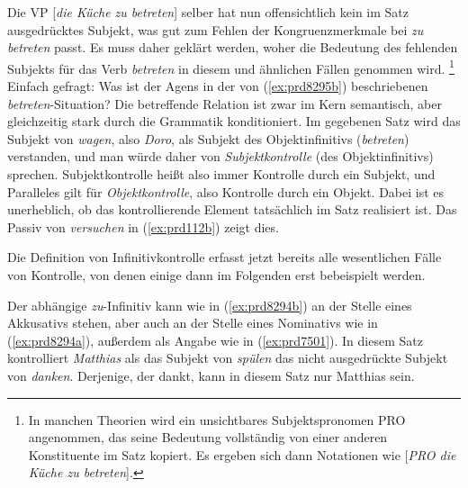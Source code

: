 Die VP [\textit{die Küche zu betreten}] selber hat nun offensichtlich kein im Satz ausgedrücktes Subjekt, was gut zum Fehlen der Kongruenzmerkmale bei \textit{zu betreten} passt.
Es muss daher geklärt werden, woher die Bedeutung des fehlenden Subjekts für das Verb \textit{betreten} in diesem und ähnlichen Fällen genommen wird.%
\footnote{In manchen Theorien wird ein unsichtbares Subjektspronomen PRO angenommen, das seine Bedeutung vollständig von einer anderen Konstituente im Satz kopiert.
Es ergeben sich dann Notationen wie [\textit{PRO die Küche zu betreten}].}
Einfach gefragt:
Was ist der Agens in der von (\ref{ex:prd8295b}) beschriebenen \textit{betreten}-Situation?
Die betreffende Relation ist zwar im Kern semantisch, aber gleichzeitig stark durch die Grammatik konditioniert.
Im gegebenen Satz wird das Subjekt von \textit{wagen}, also \textit{Doro}, als Subjekt des Objektinfinitivs (\textit{betreten}) verstanden, und man würde daher von \textit{Subjektkontrolle} (des Objektinfinitivs) sprechen.
Subjektkontrolle heißt also immer Kontrolle durch ein Subjekt, und Paralleles gilt für \textit{Objektkontrolle}, also Kontrolle durch ein Objekt.
Dabei ist es unerheblich, ob das kontrollierende Element tatsächlich im Satz realisiert ist.
Das Passiv von \textit{versuchen} in (\ref{ex:prd112b}) zeigt dies.

\begin{exe}
  \ex\label{ex:prd112} 
  \begin{xlist}
  \end{xlist}
\end{exe}

Die Definition von Infinitivkontrolle erfasst jetzt bereits alle wesentlichen Fälle von Kontrolle, von denen einige dann im Folgenden erst bebeispielt werden.


Der abhängige \textit{zu}-Infinitiv kann wie in (\ref{ex:prd8294b}) an der Stelle eines Akkusativs stehen, aber auch an der Stelle eines Nominativs wie in (\ref{ex:prd8294a}), außerdem als Angabe wie in (\ref{ex:prd7501}).
In diesem Satz kontrolliert \textit{Matthias} als das Subjekt von \textit{spülen} das nicht ausgedrückte Subjekt von \textit{danken}.
Derjenige, der dankt, kann in diesem Satz nur Matthias sein.

